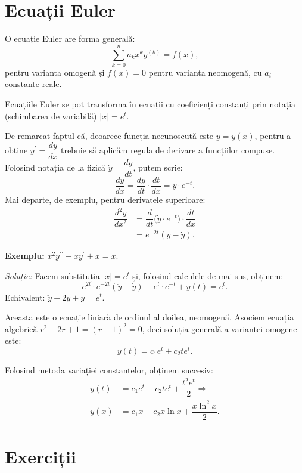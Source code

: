 \section{Ecuații Euler}

O ecuație Euler are forma generală:
\[
  \sum_{k = 0}^n a_k x^k y^{(k)} = f(x),
\]
pentru varianta omogenă și $ f(x) = 0 $ pentru varianta neomogenă, cu $ a_i $
constante reale.

Ecuațiile Euler se pot transforma în ecuații cu coeficienți constanți prin notația
(schimbarea de variabilă) $ |x| = e^t $.

De remarcat faptul că, deoarece funcția necunoscută este $ y = y(x) $, pentru
a obține $ y^{\prime} = \dfrac{dy}{dx} $ trebuie să aplicăm regula de derivare
a funcțiilor compuse. Folosind notația de la fizică $ \dot{y} = \dfrac{dy}{dt} $,
putem scrie:
\[
  \dfrac{dy}{dx} = \dfrac{dy}{dt} \cdot \dfrac{dt}{dx} = \dot{y} \cdot e^{-t}.
\]
Mai departe, de exemplu, pentru derivatele superioare:
\begin{align*}
  \dfrac{d^2 y}{dx^2} &= \dfrac{d}{dt} \Big( \dot{y} \cdot e^{-t} \Big) %
  \cdot \dfrac{dt}{dx} \\
                      &= e^{-2t} (\ddot{y} - \dot{y}).
\end{align*}

\vspace{1cm}

\textbf{Exemplu:} $ x^2 y^{\prime\prime} + xy^{\prime} + x = x $.

\emph{Soluție:} Facem substituția $ |x| = e^t $ și, folosind calculele
de mai sus, obținem:
\[
  e^{2t} \cdot e^{-2t} (\ddot{y} - \dot{y}) - e^t \cdot e^{-t} + y(t) = e^t.
\]
Echivalent: $ \ddot{y} - 2\dot{y} + y = e^t $.

Aceasta este o ecuație liniară de ordinul al doilea, neomogenă. Asociem ecuația
algebrică $ r^2 - 2r + 1 = (r - 1)^2 = 0 $, deci soluția generală a variantei
omogene este:
\[
  y(t) = c_1 e^t + c_2 te^t.
\]

Folosind metoda variației constantelor, obținem succesiv:
\begin{align*}
  y(t) &= c_1 e^t + c_2 t e^t + \dfrac{t^2 e^t}{2} \Rightarrow \\
  y(x) &= c_1 x + c_2 x \ln x + \dfrac{x \ln^2 x}{2}.
\end{align*}



\section{Exerciții}

